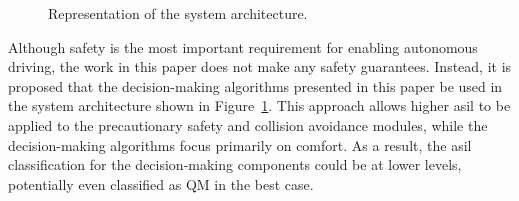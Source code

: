 \begin{figure}[h]
%
	\caption{Representation of the system architecture.}
	\label{fig:system_architecture}
\end{figure}

Although safety is the most important requirement for enabling autonomous driving, the work in this paper does not make any safety guarantees. Instead, it is proposed that the decision-making algorithms presented in this paper be used in the system architecture shown in Figure~\ref{fig:system_architecture}. This approach allows higher \gls{asil} to be applied to the precautionary safety and collision avoidance modules, while the decision-making algorithms focus primarily on comfort. As a result, the \gls{asil} classification for the decision-making components could be at lower levels, potentially even classified as QM in the best case.


 
